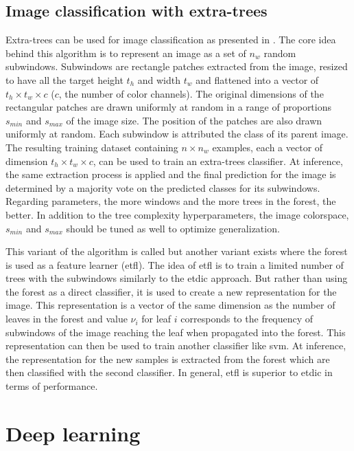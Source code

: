 \subsection{Image classification with extra-trees}
\label{ssec:backml:et_image}

Extra-trees can be used for image classification as presented in \parencite{maree2016towards}. The core idea behind this algorithm is to represent an image as a set of $n_w$ random subwindows. Subwindows are rectangle patches extracted from the image, resized to have all the target height $t_h$ and width $t_w$ and flattened into a vector of $t_h \times t_w \times c$ ($c$, the number of color channels). The original dimensions of the rectangular patches are drawn uniformly at random in a range of proportions $s_{min}$ and $s_{max}$ of the image size. The position of the patches are also drawn uniformly at random. Each subwindow is attributed the class of its parent image. The resulting training dataset containing $n \times n_w$ examples, each a vector of dimension $t_h \times t_w \times c$, can be used to train an extra-trees classifier. At inference, the same extraction process is applied and the final prediction for the image is determined by a majority vote on the predicted classes for its subwindows. Regarding parameters, the more windows and the more trees in the forest, the better. In addition to the tree complexity hyperparameters, the image colorspace, $s_{min}$ and $s_{max}$ should be tuned as well to optimize generalization.

This variant of the algorithm is called  but another variant exists where the forest is used as a feature learner (\acrshort{etfl}). The idea of \acrshort{etfl} is to train a limited number of trees with the subwindows similarly to the \acrshort{etdic} approach. But rather than using the forest as a direct classifier, it is used to create a new representation for the image. This representation is a vector of the same dimension as the number of leaves in the forest and value $\nu_i$ for leaf $i$ corresponds to the frequency of subwindows of the image reaching the leaf when propagated into the forest. This representation can then be used to train another classifier like \acrshort{svm}. At inference, the representation for the new samples is extracted from the forest which are then classified with the second classifier. In general, \acrshort{etfl} is superior to \acrshort{etdic} in terms of performance.


\section{Deep learning}
\label{sec:backml:deeplearning}

